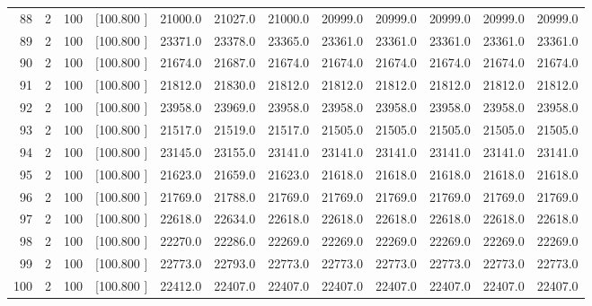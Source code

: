 \documentclass[12pt,a4paper]{article}
\begin{document}
\begin{center}
{\begin{tabular}{r r r r r r r r r r r r}
  88&  2&100&[100.800   ]& 21000.0& 21027.0& 21000.0& 20999.0& 20999.0& 20999.0& 20999.0& 20999.0\\[-0.02in]
  89&  2&100&[100.800   ]& 23371.0& 23378.0& 23365.0& 23361.0& 23361.0& 23361.0& 23361.0& 23361.0\\[-0.02in]
  90&  2&100&[100.800   ]& 21674.0& 21687.0& 21674.0& 21674.0& 21674.0& 21674.0& 21674.0& 21674.0\\[-0.02in]
  91&  2&100&[100.800   ]& 21812.0& 21830.0& 21812.0& 21812.0& 21812.0& 21812.0& 21812.0& 21812.0\\[-0.02in]
  92&  2&100&[100.800   ]& 23958.0& 23969.0& 23958.0& 23958.0& 23958.0& 23958.0& 23958.0& 23958.0\\[-0.02in]
  93&  2&100&[100.800   ]& 21517.0& 21519.0& 21517.0& 21505.0& 21505.0& 21505.0& 21505.0& 21505.0\\[-0.02in]
  94&  2&100&[100.800   ]& 23145.0& 23155.0& 23141.0& 23141.0& 23141.0& 23141.0& 23141.0& 23141.0\\[-0.02in]
  95&  2&100&[100.800   ]& 21623.0& 21659.0& 21623.0& 21618.0& 21618.0& 21618.0& 21618.0& 21618.0\\[-0.02in]
  96&  2&100&[100.800   ]& 21769.0& 21788.0& 21769.0& 21769.0& 21769.0& 21769.0& 21769.0& 21769.0\\[-0.02in]
  97&  2&100&[100.800   ]& 22618.0& 22634.0& 22618.0& 22618.0& 22618.0& 22618.0& 22618.0& 22618.0\\[-0.02in]
  98&  2&100&[100.800   ]& 22270.0& 22286.0& 22269.0& 22269.0& 22269.0& 22269.0& 22269.0& 22269.0\\[-0.02in]
  99&  2&100&[100.800   ]& 22773.0& 22793.0& 22773.0& 22773.0& 22773.0& 22773.0& 22773.0& 22773.0\\[-0.02in]
 100&  2&100&[100.800   ]& 22412.0& 22407.0& 22407.0& 22407.0& 22407.0& 22407.0& 22407.0& 22407.0\\[-0.02in]

\hline
\end{tabular}}
\end{center}
\newpage
\end{document}
